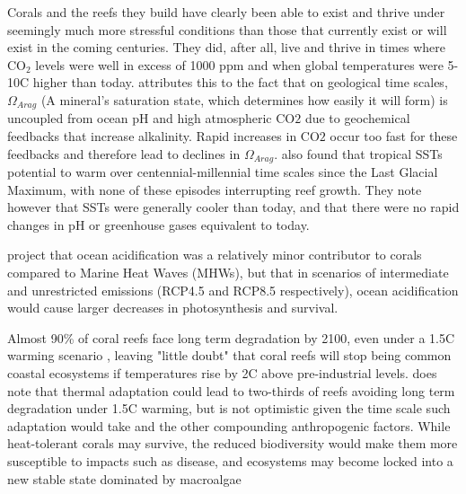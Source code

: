 \documentclass[11pt,a4paper]{article}
\begin{document}
Corals and the reefs they build have clearly been able to exist and thrive under seemingly much more stressful conditions than those that currently exist or will exist in the coming centuries. They did, after all, live and thrive in times where CO$_{2}$ levels were well in excess of 1000 ppm and when global temperatures were 5-10\textdegree C higher than today. \cite{Pandolfi2011} attributes this to the fact that on geological time scales, $\Omega_{Arag}$ (A mineral's saturation state, which determines how easily it will form) is uncoupled from ocean pH and high atmospheric CO${2}$ due to geochemical feedbacks that increase alkalinity. Rapid increases in CO${2}$ occur too fast for these feedbacks and therefore lead to declines in $\Omega_{Arag}$. %
\cite{Pandolfi2011} also found that tropical SSTs potential to warm over centennial-millennial time scales since the Last Glacial Maximum, with none of these episodes interrupting reef growth. They note however that SSTs were generally cooler than today, and that there were no rapid changes in pH or greenhouse gases equivalent to today. %

\cite{Klein2022} project that ocean acidification was a relatively minor contributor to corals compared to Marine Heat Waves (MHWs), but that in scenarios of intermediate and unrestricted emissions (RCP4.5 and RCP8.5 respectively), ocean acidification would cause larger decreases in photosynthesis and survival.

Almost 90\% of coral reefs face long term degradation by 2100, even under a 1.5\textdegree C warming scenario \citep{Frieler2013}, leaving "little doubt" that coral reefs will stop being common coastal ecosystems if temperatures rise by 2\textdegree C above pre-industrial levels. \cite{Frieler2013} does note that thermal adaptation could lead to two-thirds of reefs avoiding long term degradation under 1.5\textdegree C warming, but is not optimistic given the time scale such adaptation would take and the other compounding anthropogenic factors. While heat-tolerant corals may survive, the reduced biodiversity would make them more susceptible to impacts such as disease, and ecosystems may become locked into a new stable state dominated by macroalgae \citep{Mumby2007}

\end{document}
